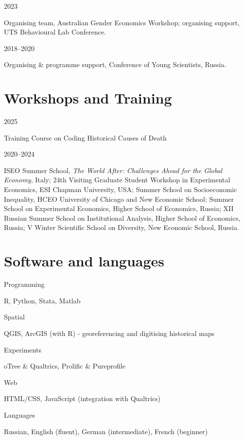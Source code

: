 \documentclass[11pt,a4paper]{article}
\newif\ifreferees
\newcommand{\entry}[2]{%
  \begin{minipage}[t]{0.15\textwidth}\raggedright\small #1\end{minipage}%
  \hfill%
  \begin{minipage}[t]{0.83\textwidth}#2\end{minipage}%
  \par\vspace{5pt}}
\newcommand{\nodate}[1]{#1\par\vspace{7pt}}
\begin{document}
\entry{2023}{Organising team, Australian Gender Economics Workshop; organising support, UTS
  Behavioural Lab Conference.}

\entry{2018--2020}{Organising \& programme support, Conference of Young Scientists, Russia.}

\section{Workshops and Training}

\entry{2025}{Training Course on Coding Historical Causes of Death}

\entry{2020--2024}{ISEO Summer School, \emph{The World After: Challenges Ahead for the Global
  Economy}, Italy; 24th Visiting Graduate Student Workshop in Experimental Economics, ESI Chapman
  University, USA; Summer School on Socioeconomic Inequality, HCEO University of Chicago and
  New Economic School; Summer School on Experimental Economics, Higher School of Economics, Russia;
  XII Russian Summer School on Institutional Analysis, Higher School of Economics, Russia;
  V Winter Scientific School on Diversity, New Economic School, Russia.}



\section{Software and languages}

\entry{Programming}{R, Python, Stata, Matlab}

\entry{Spatial}{QGIS, ArcGIS (with R) - georeferencing and digitising historical maps}

\entry{Experiments}{oTree \& Qualtrics, Prolific \& Pureprofile}

\entry{Web}{HTML/CSS, JavaScript (integration with Qualtrics)}





\entry{Languages}{Russian, English (fluent), German (intermediate), French (beginner)}
\ifreferees
\needspace{4\baselineskip}
\section{Referees}

\nodate{\textbf{Prof.\ Adeline Delavande} \par
  {\small University of Technology Sydney\ \ $\cdot$\ \
   \href{mailto:Adeline.Delavande@uts.edu.au}{Adeline.Delavande@uts.edu.au}}}

\nodate{\textbf{Prof. Elif Incekara-Hafalir} \par
  {\small University of Technology Sydney\ \ $\cdot$\ \
   \href{mailto:Elif.IncekaraHafalir@uts.edu.au}{Elif.IncekaraHafalir@uts.edu.au}}}

\nodate{\textbf{Dr Esther Mirjam Girsberger} \par
  {\small University of Technology Sydney\ \ $\cdot$\ \
   \href{mailto:EstherMirjam.Girsberger@uts.edu.au}{EstherMirjam.Girsberger@uts.edu.au}}}
\fi
\end{document}
